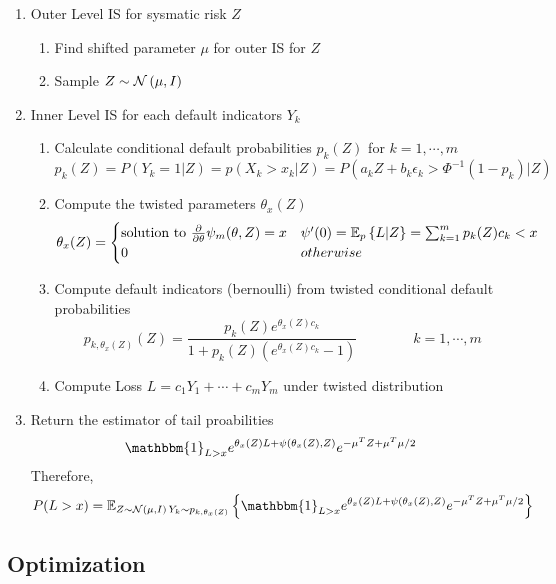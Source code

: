 \documentclass[11pt]{article}
\begin{document}
\begin{enumerate}
    \item Outer Level IS for sysmatic risk $Z$ 
    \begin{enumerate}
        \item Find shifted parameter $\mu$ for outer IS for $Z$
        \item Sample $Z \sim \normal{\mu, I}$ 
    \end{enumerate}
    \item Inner Level IS for each default indicators $Y_k$ 
    \begin{enumerate}
        \item Calculate conditional default probabilities $p_k(Z)$ for $k=1,\cdots, m$
        \[
            p_k(Z) = P(Y_k=1 | Z) = p(X_k > x_k | Z) = P(a_k Z + b_k \epsilon_k > \Phi^{-1}(1-p_k) | Z)
        \]
        \item Compute the twisted parameters $\theta_x(Z)$ 
        \[
            \theta_x(Z) = 
            \begin{cases}
                \text{solution to } \frac{\partial}{\partial \theta}\psi_m(\theta, Z) = x & \psi'(0) = \E[p]{L|Z} = \sum_{k=1}^m p_k(Z) c_k < x \\ 
                0 & otherwise \\ 
            \end{cases}    
        \]
        \item Compute default indicators (bernoulli) from twisted conditional default probabilities
        \[
            p_{k,\theta_x(Z)} (Z) = \frac{p_k(Z) e^{\theta_x(Z)c_k}}{1 + p_k(Z)(e^{\theta_x(Z)c_k} - 1)}
            \qquad 
            \qquad 
            k = 1,\cdots, m
        \]
        \item Compute Loss $L = c_1 Y_1 + \cdots + c_m Y_m$ under twisted distribution
    \end{enumerate}
    \item Return the estimator of tail proabilities
    \[
        \mathbbm{1}_{L>x} e^{\theta_x(Z)L + \psi(\theta_x(Z), Z)} e^{ -\mu^T Z + \mu^T \mu /2 }
    \]
    Therefore,
    \[
        P(L > x) = \E[Z\sim \normal{\mu, I} \, Y_k \sim p_{k, \theta_x(Z)}]{
            \mathbbm{1}_{L>x} e^{\theta_x(Z)L + \psi(\theta_x(Z), Z)} e^{ -\mu^T Z + \mu^T \mu /2 }
        }
    \]
\end{enumerate}

\newpage 
\subsection*{Optimization}
\end{document}
